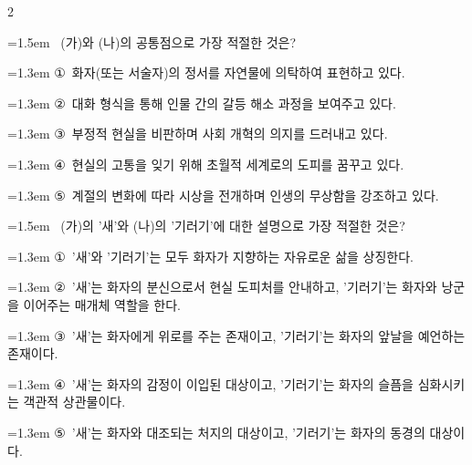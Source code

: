 \documentclass[10pt, a4paper]{article}
\begin{document}
\begin{multicols}{2}
\noindent\begin{minipage}{\columnwidth}
\vspace{2mm}
{\hangindent=1.5em  ~(가)와 (나)의 공통점으로 가장 적절한 것은?\par}

\vspace{0.5mm}
{\hangindent=1.3em  \noindent\hspace{0.3em}①~화자(또는 서술자)의 정서를 자연물에 의탁하여 표현하고 있다.\par}
{\hangindent=1.3em  \noindent\hspace{0.3em}②~대화 형식을 통해 인물 간의 갈등 해소 과정을 보여주고 있다.\par}
{\hangindent=1.3em  \noindent\hspace{0.3em}③~부정적 현실을 비판하며 사회 개혁의 의지를 드러내고 있다.\par}
{\hangindent=1.3em  \noindent\hspace{0.3em}④~현실의 고통을 잊기 위해 초월적 세계로의 도피를 꿈꾸고 있다.\par}
{\hangindent=1.3em  \noindent\hspace{0.3em}⑤~계절의 변화에 따라 시상을 전개하며 인생의 무상함을 강조하고 있다.\par}
\vspace{4mm}
\end{minipage}
\par

\noindent\begin{minipage}{\columnwidth}
\vspace{2mm}
{\hangindent=1.5em  ~(가)의 '새'와 (나)의 '기러기'에 대한 설명으로 가장 적절한 것은?\par}

\vspace{0.5mm}
{\hangindent=1.3em  \noindent\hspace{0.3em}①~'새'와 '기러기'는 모두 화자가 지향하는 자유로운 삶을 상징한다.\par}
{\hangindent=1.3em  \noindent\hspace{0.3em}②~'새'는 화자의 분신으로서 현실 도피처를 안내하고, '기러기'는 화자와 낭군을 이어주는 매개체 역할을 한다.\par}
{\hangindent=1.3em  \noindent\hspace{0.3em}③~'새'는 화자에게 위로를 주는 존재이고, '기러기'는 화자의 앞날을 예언하는 존재이다.\par}
{\hangindent=1.3em  \noindent\hspace{0.3em}④~'새'는 화자의 감정이 이입된 대상이고, '기러기'는 화자의 슬픔을 심화시키는 객관적 상관물이다.\par}
{\hangindent=1.3em  \noindent\hspace{0.3em}⑤~'새'는 화자와 대조되는 처지의 대상이고, '기러기'는 화자의 동경의 대상이다.\par}
\vspace{4mm}
\end{minipage}
\par


\end{multicols}
\end{document}
